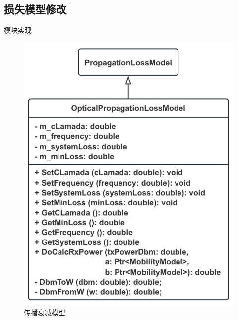 \documentclass{beamer}
\begin{document}
\subsection{损失模型修改}
\begin{frame}{模块实现}
	\begin{figure}[h]
		\centering
		\includegraphics[height=0.8\textheight]{pic/传播衰减模型.png}
		\caption{传播衰减模型}
	\end{figure}
\end{frame}
\end{document}
